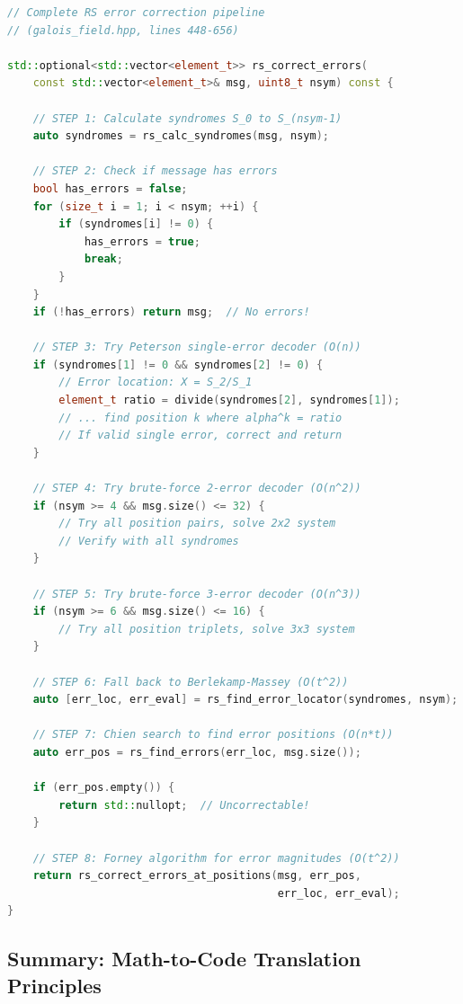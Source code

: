 \documentclass[11pt,a4paper]{article}
\begin{document}
\begin{lstlisting}[language=C++, basicstyle=\small\ttfamily]
// Complete RS error correction pipeline
// (galois_field.hpp, lines 448-656)

std::optional<std::vector<element_t>> rs_correct_errors(
    const std::vector<element_t>& msg, uint8_t nsym) const {

    // STEP 1: Calculate syndromes S_0 to S_(nsym-1)
    auto syndromes = rs_calc_syndromes(msg, nsym);

    // STEP 2: Check if message has errors
    bool has_errors = false;
    for (size_t i = 1; i < nsym; ++i) {
        if (syndromes[i] != 0) {
            has_errors = true;
            break;
        }
    }
    if (!has_errors) return msg;  // No errors!

    // STEP 3: Try Peterson single-error decoder (O(n))
    if (syndromes[1] != 0 && syndromes[2] != 0) {
        // Error location: X = S_2/S_1
        element_t ratio = divide(syndromes[2], syndromes[1]);
        // ... find position k where alpha^k = ratio
        // If valid single error, correct and return
    }

    // STEP 4: Try brute-force 2-error decoder (O(n^2))
    if (nsym >= 4 && msg.size() <= 32) {
        // Try all position pairs, solve 2x2 system
        // Verify with all syndromes
    }

    // STEP 5: Try brute-force 3-error decoder (O(n^3))
    if (nsym >= 6 && msg.size() <= 16) {
        // Try all position triplets, solve 3x3 system
    }

    // STEP 6: Fall back to Berlekamp-Massey (O(t^2))
    auto [err_loc, err_eval] = rs_find_error_locator(syndromes, nsym);

    // STEP 7: Chien search to find error positions (O(n*t))
    auto err_pos = rs_find_errors(err_loc, msg.size());

    if (err_pos.empty()) {
        return std::nullopt;  // Uncorrectable!
    }

    // STEP 8: Forney algorithm for error magnitudes (O(t^2))
    return rs_correct_errors_at_positions(msg, err_pos,
                                          err_loc, err_eval);
}
\end{lstlisting}

\subsection{Summary: Math-to-Code Translation Principles}
\end{document}
